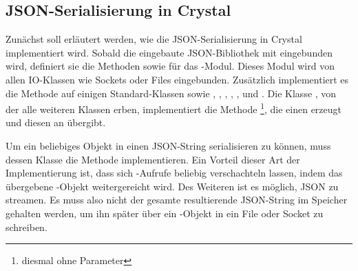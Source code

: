 \subsection{JSON-Serialisierung in Crystal}
\label{ssec:bj_json_serialisierung_in_crystal}

Zunächst soll erläutert werden, wie die JSON-Serialisierung in Crystal
implementiert wird.  Sobald die eingebaute JSON-Bibliothek mit  eingebunden wird, definiert sie die Methoden  sowie
 für das -Modul.  Dieses Modul wird von allen
IO-Klassen wie Sockets oder Files eingebunden.  Zusätzlich implementiert es
die Methode  auf einigen Standard-Klassen sowie
, , , , ,
 und .  Die Klasse , von der alle weiteren
Klassen erben, implementiert die Methode \footnote{diesmal ohne
Parameter}, die einen  erzeugt und diesen an
 übergibt.

Um ein beliebiges Objekt in einen JSON-String serialisieren zu können, muss
dessen Klasse die Methode  implementieren.  Ein Vorteil
dieser Art der Implementierung ist, dass sich -Aufrufe
beliebig verschachteln lassen, indem das übergebene -Objekt
weitergereicht wird.  Des Weiteren ist es möglich, JSON zu streamen.  Es muss
also nicht der gesamte resultierende JSON-String im Speicher gehalten werden,
um ihn später über ein -Objekt in ein File oder Socket zu schreiben.
